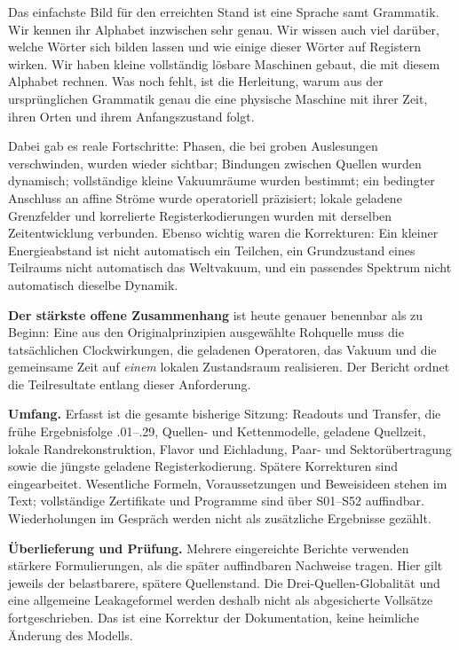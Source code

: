 \documentclass[11pt,a4paper,oneside,parskip=half,headings=normal,numbers=noenddot,bibliography=totoc]{scrreprt}
\begin{document}
Das einfachste Bild für den erreichten Stand ist eine Sprache samt Grammatik. Wir kennen ihr Alphabet inzwischen sehr genau. Wir wissen auch viel darüber, welche Wörter sich bilden lassen und wie einige dieser Wörter auf Registern wirken. Wir haben kleine vollständig lösbare Maschinen gebaut, die mit diesem Alphabet rechnen. Was noch fehlt, ist die Herleitung, warum aus der ursprünglichen Grammatik genau die eine physische Maschine mit ihrer Zeit, ihren Orten und ihrem Anfangszustand folgt.

Dabei gab es reale Fortschritte: Phasen, die bei groben Auslesungen verschwinden, wurden wieder sichtbar; Bindungen zwischen Quellen wurden dynamisch; vollständige kleine Vakuumräume wurden bestimmt; ein bedingter Anschluss an affine Ströme wurde operatoriell präzisiert; lokale geladene Grenzfelder und korrelierte Registerkodierungen wurden mit derselben Zeitentwicklung verbunden. Ebenso wichtig waren die Korrekturen: Ein kleiner Energieabstand ist nicht automatisch ein Teilchen, ein Grundzustand eines Teilraums nicht automatisch das Weltvakuum, und ein passendes Spektrum nicht automatisch dieselbe Dynamik.

\textbf{Der stärkste offene Zusammenhang} ist heute genauer benennbar als zu Beginn: Eine aus den Originalprinzipien ausgewählte Rohquelle muss die tatsächlichen Clockwirkungen, die geladenen Operatoren, das Vakuum und die gemeinsame Zeit auf \emph{einem} lokalen Zustandsraum realisieren. Der Bericht ordnet die Teilresultate entlang dieser Anforderung.

\textbf{Umfang.} Erfasst ist die gesamte bisherige Sitzung: Readouts und Transfer, die frühe Ergebnisfolge .01--.29, Quellen- und Kettenmodelle, geladene Quellzeit, lokale Randrekonstruktion, Flavor und Eichladung, Paar- und Sektorübertragung sowie die jüngste geladene Registerkodierung. Spätere Korrekturen sind eingearbeitet. Wesentliche Formeln, Voraussetzungen und Beweisideen stehen im Text; vollständige Zertifikate und Programme sind über S01--S52 auffindbar. Wiederholungen im Gespräch werden nicht als zusätzliche Ergebnisse gezählt.

\textbf{Überlieferung und Prüfung.} Mehrere eingereichte Berichte verwenden stärkere Formulierungen, als die später auffindbaren Nachweise tragen. Hier gilt jeweils der belastbarere, spätere Quellenstand. Die Drei-Quellen-Globalität und eine allgemeine Leakageformel werden deshalb nicht als abgesicherte Vollsätze fortgeschrieben. Das ist eine Korrektur der Dokumentation, keine heimliche Änderung des Modells.
\tableofcontents
\clearpage
{}
\end{document}
